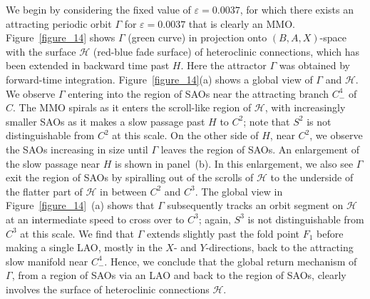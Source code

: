 \documentclass{ws-ijbc}
\begin{document}
We begin by considering the fixed value of $\varepsilon=0.0037$, for which there exists an attracting periodic orbit $\Gamma$ for $\varepsilon=0.0037$ that is clearly an MMO. Figure~\ref{figure_14} shows $\Gamma$ (green curve) in projection onto $(B,A,X)$-space with the surface $\mathscr{H}$ (red-blue fade surface) of heteroclinic connections, which has been extended in backward time past $H$.  Here the attractor $\Gamma$ was obtained by forward-time integration.  Figure~\ref{figure_14}(a) shows a global view of $\Gamma$ and $\mathscr{H}$.  We observe $\Gamma$ entering into the region of SAOs near the attracting branch $C^4_-$ of $C$.  The MMO spirals as it enters the scroll-like region of $\mathscr{H}$, with increasingly smaller SAOs as it makes a slow passage past $H$ to $C^2$; note that $S^2$ is not distinguishable from $C^2$ at this scale.  On the other side of $H$, near $C^2$, we observe the SAOs increasing in size until $\Gamma$ leaves the region of SAOs.  An enlargement of the slow passage near $H$ is shown in panel~(b).  In this enlargement, we also see $\Gamma$ exit the region of SAOs by spiralling out of the scrolls of $\mathscr{H}$ to the underside of the flatter part of $\mathscr{H}$ in between $C^2$ and $C^3$.  The global view in Figure~\ref{figure_14}~(a) shows that $\Gamma$ subsequently tracks an orbit segment on $\mathscr{H}$ at an intermediate speed to cross over to $C^3$; again, $S^3$ is not distinguishable from $C^3$ at this scale.  We find that $\Gamma$ extends slightly past the fold point $F_1$ before making a single LAO, mostly in the $X$- and $Y$-directions, back to the attracting slow manifold near $C^4_-$.  Hence, we conclude that the global return mechanism of $\Gamma$, from a region of SAOs via an LAO and back to the region of SAOs, clearly involves the surface of heteroclinic connections $\mathscr{H}$.
\end{document}

